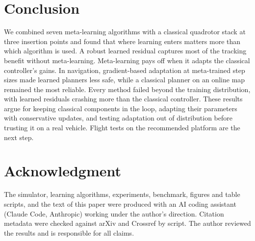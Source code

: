 \section{Conclusion}\label{sec:conclusion}

We combined seven meta-learning algorithms with a classical quadrotor stack at three insertion points and found that where learning enters matters more than which algorithm is used. A robust learned residual captures most of the tracking benefit without meta-learning. Meta-learning pays off when it adapts the classical controller's gains. In navigation, gradient-based adaptation at meta-trained step sizes made learned planners less safe, while a classical planner on an online map remained the most reliable. Every method failed beyond the training distribution, with learned residuals crashing more than the classical controller. These results argue for keeping classical components in the loop, adapting their parameters with conservative updates, and testing adaptation out of distribution before trusting it on a real vehicle. Flight tests on the recommended platform are the next step.

\section*{Acknowledgment}
The simulator, learning algorithms, experiments, benchmark, figures and table scripts, and the text of this paper were produced with an AI coding assistant (Claude Code, Anthropic) working under the author's direction. Citation metadata were checked against arXiv and Crossref by script. The author reviewed the results and is responsible for all claims.
